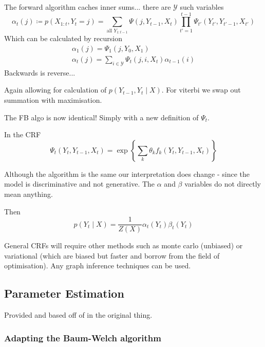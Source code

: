 \documentclass[../main.tex]{subfiles}
\begin{document}
The forward algorithm caches inner sums... there are $\mathcal{Y}$ such variables
\begin{equation*}
    \alpha_t(j) \coloneqq p (X_{1:t},Y_t=j) = \sum_{\text{all } Y_{1:t-1}} \Psi(j,Y_{t-1},X_t) \prod_{t'=1}^{t-1} \Psi_{t'}(Y_{t'},Y_{t'-1},X_{t'})
\end{equation*}
Which can be calculated by recursion
\begin{gather*}
    \alpha_1(j) = \Psi_1(j,Y_0,X_1) \\
    \alpha_t(j) = \sum_{i \in \mathcal{Y}} \Psi_t(j,i,X_t) \alpha_{t-1}(i)
\end{gather*}
Backwards is reverse...

Again allowing for calculation of $p (Y_{t-1}, Y_t \mid X)$.
For viterbi we swap out summation with maximisation.

The FB algo is now identical! Simply with a new definition of $\Psi_t$.

In the CRF
\begin{equation*}
    \Psi_t (Y_t,Y_{t-1},X_t) = \exp \left\{ \sum_k \theta_k f_k(Y_t,Y_{t-1},X_t)\right\}
\end{equation*}

Although the algorithm is the same our interpretation does change - since the model is discriminative and not generative. The $\alpha$ and $\beta$ variables do not directly mean anything.

Then
\begin{equation*}
    p (Y_t \mid X) = \frac{1}{Z(X)} \alpha_t(Y_t)\beta_t(Y_t)
\end{equation*}

General CRFs will require other methods such as monte carlo (unbiased) or variational (which are biased but faster and borrow from the field of optimisation).
Any graph inference techniques can be used.

\subsection{Parameter Estimation}

Provided and based off of \autocite{della-1997-crfparam} in the original thing.

\subsubsection{Adapting the Baum-Welch algorithm}

\end{document}

